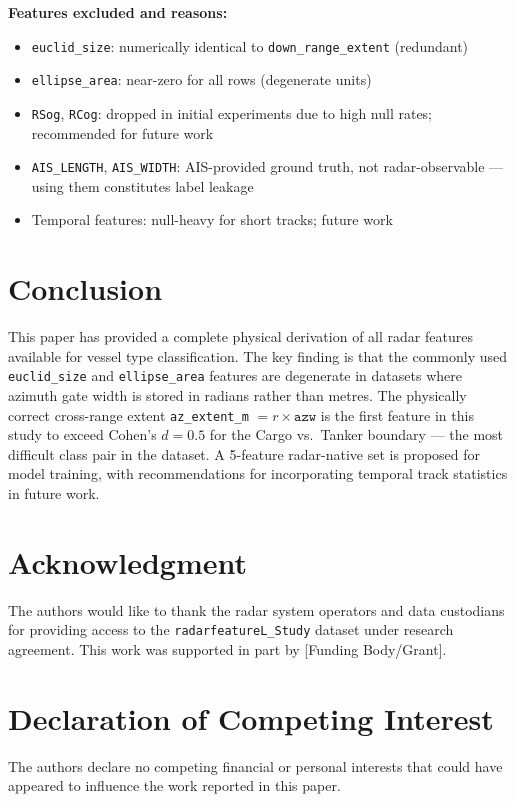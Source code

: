 \documentclass[journal]{IEEEtran}
\begin{document}
\textbf{Features excluded and reasons:}
\begin{itemize}
  \item \texttt{euclid\_size}: numerically identical to \texttt{down\_range\_extent}
        (redundant)
  \item \texttt{ellipse\_area}: near-zero for all rows (degenerate units)
  \item \texttt{RSog}, \texttt{RCog}: dropped in initial experiments due to
        high null rates; recommended for future work
  \item \texttt{AIS\_LENGTH}, \texttt{AIS\_WIDTH}: AIS-provided ground truth,
        not radar-observable — using them constitutes label leakage
  \item Temporal features: null-heavy for short tracks; future work
\end{itemize}

\section{Conclusion}

This paper has provided a complete physical derivation of all radar features
available for vessel type classification. The key finding is that the commonly
used \texttt{euclid\_size} and \texttt{ellipse\_area} features are degenerate
in datasets where azimuth gate width is stored in radians rather than metres.
The physically correct cross-range extent \texttt{az\_extent\_m} $= r \times \texttt{azw}$
is the first feature in this study to exceed Cohen's $d = 0.5$ for the
Cargo vs.\ Tanker boundary — the most difficult class pair in the dataset.
A 5-feature radar-native set is proposed for model training, with recommendations
for incorporating temporal track statistics in future work.

\section*{Acknowledgment}
The authors would like to thank the radar system operators and data custodians for providing access to the \texttt{radarfeatureL\_Study} dataset under research agreement. This work was supported in part by [Funding Body/Grant].

\section*{Declaration of Competing Interest}
The authors declare no competing financial or personal interests that could have appeared to influence the work reported in this paper.
\end{document}
